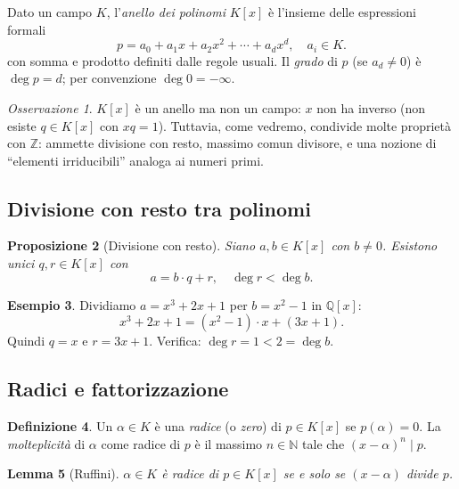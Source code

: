 \documentclass[11pt, a4paper]{book}
\theoremstyle{definition}
\newtheorem{definizione}{Definizione}[section]
\newtheorem{esempio}[definizione]{Esempio}
\theoremstyle{plain}
\newtheorem{proposizione}[definizione]{Proposizione}
\newtheorem{lemma}[definizione]{Lemma}
\theoremstyle{remark}
\newtheorem{osservazione}[definizione]{Osservazione}
\newcommand{\N}{\mathbb{N}}
\newcommand{\Z}{\mathbb{Z}}
\newcommand{\Q}{\mathbb{Q}}
\begin{document}
Dato un campo $K$, l'\emph{anello dei polinomi} $K[x]$ è l'insieme delle espressioni formali
\[
  p = a_0 + a_1 x + a_2 x^2 + \cdots + a_d x^d, \quad a_i \in K.
\]
con somma e prodotto definiti dalle regole usuali. Il \emph{grado} di $p$ (se $a_d \neq 0$) è $\deg p = d$; per convenzione $\deg 0 = -\infty$.

\begin{osservazione}
$K[x]$ è un anello ma non un campo: $x$ non ha inverso (non esiste $q \in K[x]$ con $xq = 1$). Tuttavia, come vedremo, condivide molte proprietà con $\Z$: ammette divisione con resto, massimo comun divisore, e una nozione di ``elementi irriducibili'' analoga ai numeri primi.
\end{osservazione}

\subsection{Divisione con resto tra polinomi}

\begin{proposizione}[Divisione con resto]
Siano $a, b \in K[x]$ con $b \neq 0$. Esistono unici $q, r \in K[x]$ con
\[
  a = b \cdot q + r, \quad \deg r < \deg b.
\]
\end{proposizione}

\begin{exbox}
\begin{esempio}
Dividiamo $a = x^3 + 2x + 1$ per $b = x^2 - 1$ in $\Q[x]$:
\[
  x^3 + 2x + 1 = (x^2 - 1) \cdot x + (3x + 1).
\]
Quindi $q = x$ e $r = 3x + 1$. Verifica: $\deg r = 1 < 2 = \deg b$. \checkmark
\end{esempio}
\end{exbox}

\subsection{Radici e fattorizzazione}

\begin{defbox}
\begin{definizione}
Un $\alpha \in K$ è una \emph{radice} (o \emph{zero}) di $p \in K[x]$ se $p(\alpha) = 0$. La \emph{molteplicità} di $\alpha$ come radice di $p$ è il massimo $n \in \N$ tale che $(x - \alpha)^n \mid p$.
\end{definizione}
\end{defbox}

\begin{lemma}[Ruffini]
$\alpha \in K$ è radice di $p \in K[x]$ se e solo se $(x - \alpha)$ divide $p$.
\end{lemma}
\end{document}
